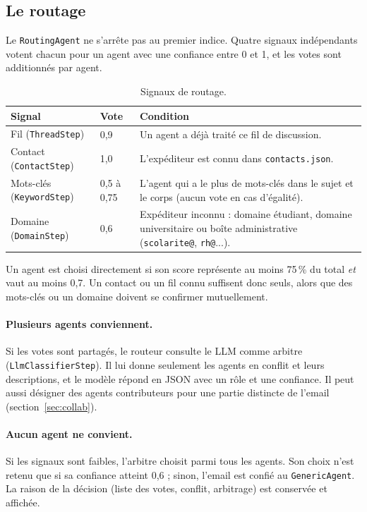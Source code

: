 \documentclass[11pt,a4paper]{article}
\newcommand{\code}[1]{\texttt{#1}}
\begin{document}
\subsection{Le routage}

Le \code{RoutingAgent} ne s'arrête pas au premier indice. Quatre signaux indépendants
votent chacun pour un agent avec une confiance entre 0 et 1, et les votes sont
additionnés par agent.

\begin{table}[H]
\centering
\small
\begin{tabularx}{\linewidth}{l l L}
\toprule
\textbf{Signal} & \textbf{Vote} & \textbf{Condition} \\
\midrule
Fil (\code{ThreadStep}) & 0,9 & Un agent a déjà traité ce fil de discussion. \\
Contact (\code{ContactStep}) & 1,0 & L'expéditeur est connu dans \code{contacts.json}. \\
Mots-clés (\code{KeywordStep}) & 0,5 à 0,75 & L'agent qui a le plus de mots-clés dans le sujet et le corps (aucun vote en cas d'égalité). \\
Domaine (\code{DomainStep}) & 0,6 & Expéditeur inconnu : domaine étudiant, domaine universitaire ou boîte administrative (\code{scolarite@}, \code{rh@}...). \\
\bottomrule
\end{tabularx}
\caption{Signaux de routage.}
\end{table}

Un agent est choisi directement si son score représente au moins 75\,\% du total
\emph{et} vaut au moins 0,7. Un contact ou un fil connu suffisent donc seuls, alors que
des mots-clés ou un domaine doivent se confirmer mutuellement.

\paragraph{Plusieurs agents conviennent.} Si les votes sont partagés, le routeur consulte
le LLM comme arbitre (\code{LlmClassifierStep}). Il lui donne seulement les agents en
conflit et leurs descriptions, et le modèle répond en JSON avec un rôle et une confiance.
Il peut aussi désigner des agents contributeurs pour une partie distincte de l'email
(section~\ref{sec:collab}).

\paragraph{Aucun agent ne convient.} Si les signaux sont faibles, l'arbitre choisit parmi
tous les agents. Son choix n'est retenu que si sa confiance atteint 0,6 ; sinon,
l'email est confié au \code{GenericAgent}. La raison de la décision (liste des votes,
conflit, arbitrage) est conservée et affichée.
\end{document}
